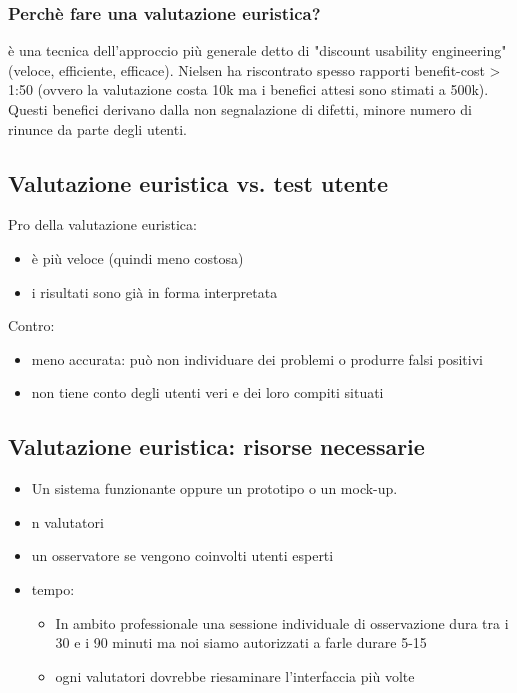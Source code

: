 \documentclass[11pt,a4paper]{book}
\begin{document}
\subsubsection{Perchè fare una valutazione euristica?}
è una tecnica dell'approccio più generale detto di "discount usability engineering" (veloce, efficiente, efficace). Nielsen ha riscontrato spesso rapporti benefit-cost > 1:50 (ovvero la valutazione costa 10k ma i benefici attesi sono stimati a 500k). Questi benefici derivano dalla non segnalazione di difetti, minore numero di rinunce da parte degli utenti.

\subsection{Valutazione euristica vs. test utente}
Pro della valutazione euristica: 
\begin{itemize}
	\item è più veloce (quindi meno costosa)
	\item i risultati sono già in forma interpretata
\end{itemize}

Contro:
\begin{itemize}
	\item meno accurata: può non individuare dei problemi o produrre falsi positivi
	\item non tiene conto degli utenti veri e dei loro compiti situati
\end{itemize}

\subsection{Valutazione euristica: risorse necessarie}
\begin{itemize}
	\item Un sistema funzionante oppure un prototipo o un mock-up.
	\item n valutatori
	\item un osservatore se vengono coinvolti utenti esperti
	\item tempo:
	\begin{itemize}
		\item In ambito professionale una sessione individuale di osservazione dura tra i 30 e i 90 minuti ma noi siamo autorizzati a farle durare 5-15
		\item ogni valutatori dovrebbe riesaminare l'interfaccia più volte
	\end{itemize}
\end{itemize}
\end{document}
